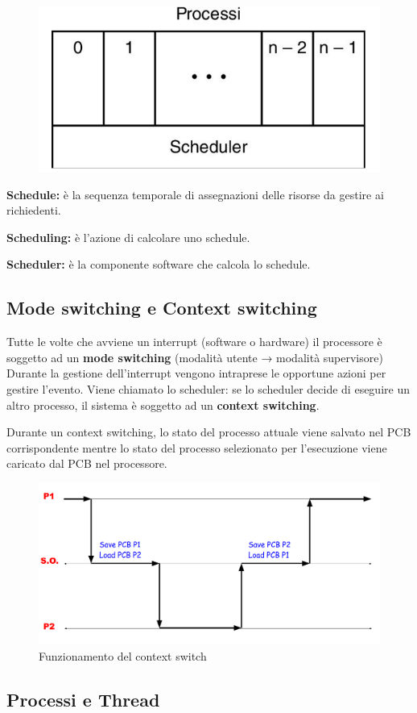 \begin{figure} [h]
    \centering
    \includegraphics[width=0.35\linewidth]{Images/Screenshot 2024-12-18 at 18-47-56 so-02.1-scheduling - so-02.1-scheduling.pdf.png}
\end{figure}
\textbf{Schedule:} è la sequenza temporale di assegnazioni delle risorse da gestire ai richiedenti.

\textbf{Scheduling:} è l'azione di calcolare uno schedule.

\textbf{Scheduler:} è la componente software che calcola lo schedule.

\subsection{Mode switching e Context switching}
Tutte le volte che avviene un interrupt (software o hardware) il
processore è soggetto ad un \textbf{mode switching} (modalità utente → modalità supervisore)
Durante la gestione dell'interrupt vengono intraprese le opportune azioni per gestire l'evento. Viene chiamato lo scheduler: se lo scheduler decide di eseguire un altro processo, il sistema è soggetto ad un \textbf{context switching}.

Durante un context switching, lo stato del processo attuale viene salvato nel PCB corrispondente mentre lo stato del processo selezionato per l'esecuzione viene caricato dal PCB
nel processore.
\begin{figure} [h]
    \centering
    \includegraphics[width=0.6\linewidth]{Images/Screenshot 2024-12-18 at 18-58-00 so-02.1-scheduling - so-02.1-scheduling.pdf.png}
    \caption{Funzionamento del context switch}
\end{figure}




\subsection{Processi e Thread}

